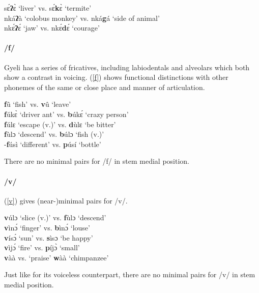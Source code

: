 \begin{exe} \ex \label{?}
sɛ́{\bfseries ʔ}ɛ̀ `liver' vs. sɛ́{\bfseries k}ɛ̀ `termite' \\
nká{\bfseries ʔ}à `colobus monkey' vs. nká{\bfseries g}á `side of animal' \\
nkɛ́{\bfseries ʔ}ɛ́ `jaw' vs. nkɛ́{\bfseries d}ɛ́ `courage'
\end{exe}

\paragraph{\bfseries /f/} Gyeli has a series of fricatives, including labiodentals and alveolars which both show a contrast in voicing. (\ref{f}) shows functional distinctions with other phonemes of the same or close place and manner of articulation.

\begin{exe} \ex \label{f}
{\bfseries f}û `fish' vs. {\bfseries v}û `leave' \\
{\bfseries f}úkɛ̀ `driver ant' vs. {\bfseries b}úkɛ́ `crazy person' \\
{\bfseries f}úlɛ `escape (v.)' vs. {\bfseries d}ùlɛ `be bitter' \\
{\bfseries f}ùlɔ `descend' vs. {\bfseries b}úlɔ `fish (v.)' \\
-{\bfseries f}úsì `different' vs. {\bfseries p}úsí `bottle'
\end{exe}

\noindent There are no minimal pairs for /f/ in stem medial position.

\paragraph{\bfseries /v/} (\ref{v}) gives (near-)minimal pairs for /v/.

\begin{exe} \ex \label{v}
{\bfseries v}úlɔ `slice (v.)' vs. {\bfseries f}ùlɔ `descend' \\
{\bfseries v}ìnɔ́ `finger' vs. {\bfseries b}ìnɔ́ `louse' \\
{\bfseries v}ísɔ́ `sun' vs. {\bfseries s}ìsɔ `be happy' \\
{\bfseries v}ìjɔ́ `fire' vs. {\bfseries p}íjɔ̀ `small' \\
{\bfseries v}àà vs. `praise' {\bfseries w}àà `chimpanzee'
\end{exe}

\noindent Just like for its voiceless counterpart, there are no minimal pairs for /v/ in stem medial position.

